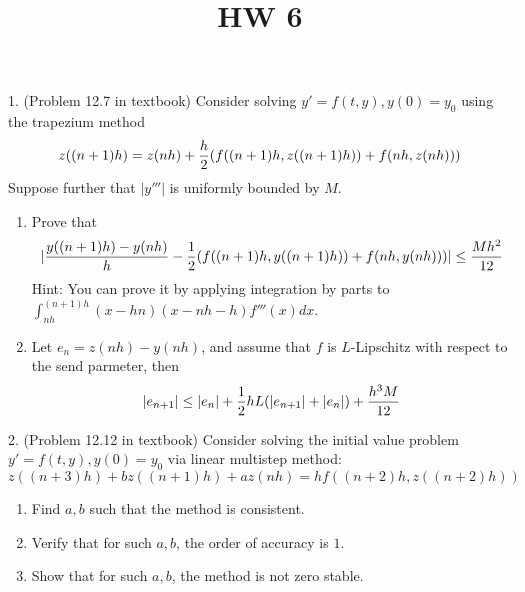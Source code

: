 \documentclass[20pt]{article} %
\title{HW 6}
\theoremstyle{break}
\begin{document}
\maketitle

1. (Problem 12.7 in textbook) Consider solving $y'=f(t, y), y(0)=y_0$ using the trapezium method
\[z((n+1)h)=z(nh)+{h\over 2}(f((n+1)h, z((n+1)h))+f(nh, z(nh)))\]
Suppose further that $|y'''|$ is uniformly bounded by $M$.
\begin{enumerate}
\item Prove that
  \[|{y((n+1)h)-y(nh)\over h}-{1\over 2}(f((n+1)h, y((n+1)h))+f(nh, y(nh)))|\leq {Mh^2\over 12}\]
  Hint: You can prove it by applying integration by parts to $\int_{nh}^{(n+1)h}(x-hn)(x-nh-h)f'''(x)dx$. 
\item Let $e_n=z(nh)-y(nh)$, and assume that $f$ is $L$-Lipschitz with respect to the send parmeter, then
  \[|e_{n+1}|\leq |e_n|+{1\over 2}hL(|e_{n+1}|+|e_n|)+{h^3M\over 12}\]
\end{enumerate}

2. (Problem 12.12 in textbook) Consider solving the initial value problem $y'=f(t, y), y(0)=y_0$ via linear multistep method:
\[z((n+3)h)+bz((n+1)h)+az(nh)=hf((n+2)h, z((n+2)h))\]
\begin{enumerate}
\item Find $a, b$ such that the method is consistent.
\item Verify that for such $a, b$, the order of accuracy is $1$.
\item Show that for such $a, b$, the method is not zero stable.
\end{enumerate}
\end{document}
